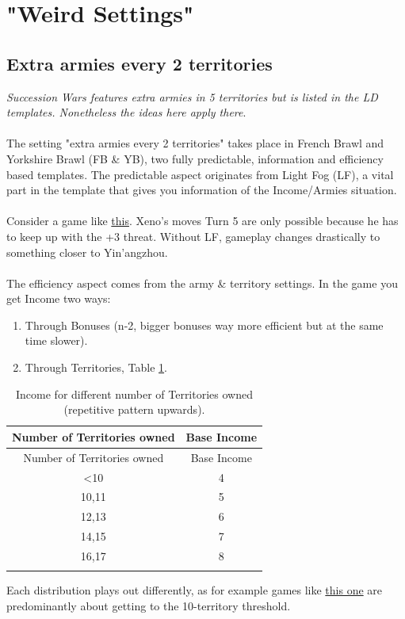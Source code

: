 \section{"Weird Settings"}
\subsection{Extra armies every 2 territories}

\textit{Succession Wars features extra armies in 5 territories but is listed in the LD templates. Nonetheless the ideas here apply there}.
\\
\\
The setting "extra armies every 2 territories" takes place in French Brawl and Yorkshire Brawl (FB \& YB), two fully predictable, information and efficiency based templates. The predictable aspect originates from Light Fog (LF), a vital part in the template that gives you information of the Income/Armies situation.
\\
\\
Consider a game like \href{https://www.warzone.com/MultiPlayer?GameID=32826121}{this}. Xeno's moves Turn 5 are only possible because he has to keep up with the +3 threat. Without LF, gameplay changes drastically to something closer to Yin'angzhou.
\\
\\
The efficiency aspect comes from the army \& territory settings. In the game you get Income two ways:
\begin{enumerate}
    \item Through Bonuses (n-2, bigger bonuses way more efficient but at the same time slower).
    \item Through Territories, Table \ref{income_fb_yb}.
\end{enumerate}

\small
\begin{longtable}{|c|c|}
\hline
\rowcolor{Baby_Blue}
Number of Territories owned & Base Income \\
\hline\hline
\endfirsthead
\hline
\rowcolor{Baby_Blue}
Number of Territories owned & Base Income \\ 
\hline\hline
\endhead
<10 & 4 \\ 
10,11 & 5 \\
12,13 & 6 \\
14,15 & 7 \\
16,17 & 8 \\
\hline
\caption{Income for different number of Territories owned (repetitive pattern upwards).}
\label{income_fb_yb}
\end{longtable}
\normalsize

Each distribution plays out differently, as for example games like \href{https://www.warzone.com/MultiPlayer?GameID=41456044}{this one} are predominantly about getting to the 10-territory threshold.